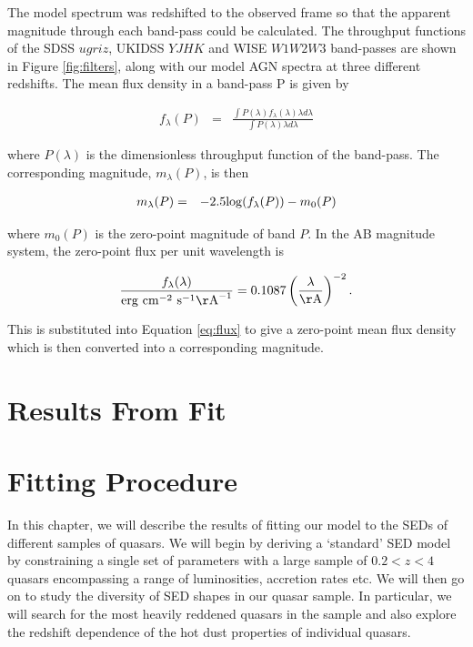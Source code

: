 The model spectrum was redshifted to the observed frame so that the apparent magnitude through each band-pass could be calculated. The throughput functions of the SDSS $ugriz$, UKIDSS $YJHK$ and WISE $W1W2W3$ band-passes are shown in Figure \ref{fig:filters}, along with our model AGN spectra at three different redshifts. The mean flux density in a band-pass P is given by 

\begin{eqnarray}
  \label{eq:flux}
  f_{\lambda}(P) & = & \frac{\int P(\lambda) f_\lambda(\lambda) \lambda d\lambda }{\int P(\lambda) \lambda d\lambda}
\end{eqnarray}

where $P(\lambda)$ is the dimensionless throughput function of the band-pass. The corresponding magnitude, $m_\lambda(P)$, is then 

\begin{eqnarray}
  m_\lambda(P) & = & -2.5{\rm log}(f_\lambda(P)) - m_0(P)
\end{eqnarray}

where $m_0(P)$ is the zero-point magnitude of band $P$. In the AB magnitude system, the zero-point flux per unit wavelength is 

\begin{eqnarray}
  \frac{f_\lambda(\lambda)}{{\rm erg}~{\rm cm}^{-2}~{\rm s}^{-1} {\rm\AA}^{-1}} = 0.1087 \left(\frac{\lambda}{\rm \AA}\right)^{-2} .
\end{eqnarray}

This is substituted into Equation \ref{eq:flux} to give a zero-point mean flux density which is then converted into a corresponding magnitude.  

\newpage

\section{Results From Fit} 
\label{chapter:results}

\section{Fitting Procedure}

In this chapter, we will describe the results of fitting our model to the SEDs of different samples of quasars. We will begin by deriving a `standard' SED model by constraining a single set of parameters with a large sample of $0.2 < z < 4$ quasars encompassing a range of luminosities, accretion rates etc. We will then go on to study the diversity of SED shapes in our quasar sample. In particular, we will search for the most heavily reddened quasars in the sample and also explore the redshift dependence of the hot dust properties of individual quasars. 

